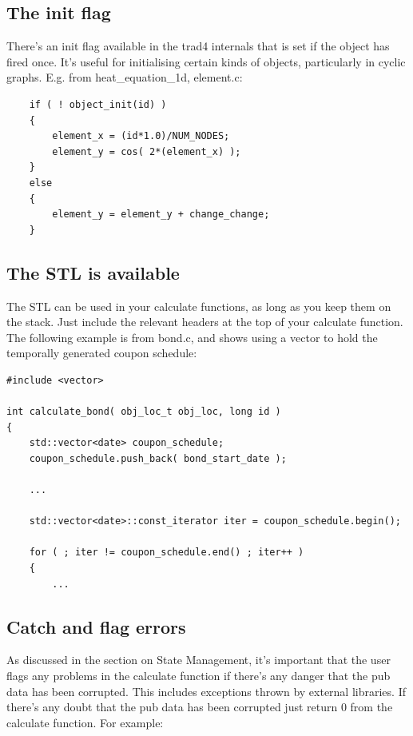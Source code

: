 \documentclass{report}
\begin{document}
\subsection{The init flag}

There's an init flag available in the trad4 internals that is set if the object has fired once. It's useful for initialising certain kinds of objects, particularly in cyclic graphs. E.g. from heat_equation_1d, element.c:

\begin{verbatim}
    if ( ! object_init(id) )
    {
        element_x = (id*1.0)/NUM_NODES;
        element_y = cos( 2*(element_x) );
    }
    else
    {
        element_y = element_y + change_change;
    }
\end{verbatim}

\subsection{The STL is available}

The STL  can be used in your calculate functions, as long as you keep them on the stack. Just include the relevant headers at the top of your calculate function. The following example is from bond.c, and shows using a vector to hold the temporally generated coupon schedule:

\begin{verbatim}
#include <vector>

int calculate_bond( obj_loc_t obj_loc, long id )
{
    std::vector<date> coupon_schedule;
    coupon_schedule.push_back( bond_start_date );

    ...

    std::vector<date>::const_iterator iter = coupon_schedule.begin();

    for ( ; iter != coupon_schedule.end() ; iter++ )
    {
        ...
\end{verbatim}


\subsection{Catch and flag errors}

As discussed in the section on State Management, it's important that the user flags any problems in the calculate function if there's any danger that the pub data has been corrupted. This includes exceptions thrown by external libraries. If there's any doubt that the pub data has been corrupted just return 0 from the calculate function. For example:
\end{document}
